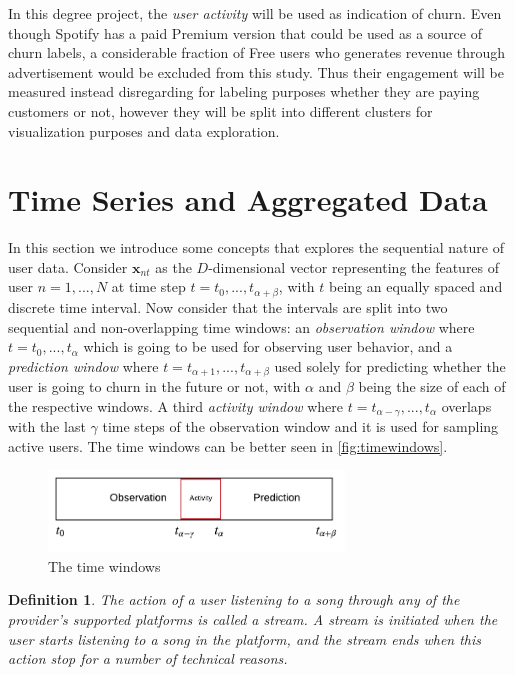 \documentclass{kththesis}
\newtheorem{definition}{Definition}
\begin{document}
In this degree project, the \emph{user activity} will be used as indication of churn. Even though Spotify has a paid Premium version that could be used as a source of churn labels, a considerable fraction of Free users who generates revenue through advertisement would be excluded from this study. Thus their engagement will be measured instead disregarding for labeling purposes whether they are paying customers or not, however they will be split into different clusters for visualization purposes and data exploration.

\section{Time Series and Aggregated Data}
\label{sec:timewindows}

In this section we introduce some concepts that explores the sequential nature of user data. Consider $\mathbf{x}_{nt}$ as the $D$-dimensional vector representing the features of user $n=1,...,N$ at time step $t = t_0,...,t_{\alpha+\beta}$, with $t$ being an equally spaced and discrete time interval. Now consider that the intervals are split into two sequential and non-overlapping time windows: an \emph{observation window} where $t = t_0,...,t_\alpha$ which is going to be used for observing user behavior, and a \emph{prediction window} where $t = t_{\alpha+1},...,t_{\alpha+\beta}$ used solely for predicting whether the user is going to churn in the future or not, with $\alpha$ and $\beta$ being the size of each of the respective windows. A third \emph{activity window} where $t=t_{\alpha-\gamma},...,t_\alpha$ overlaps with the last $\gamma$ time steps of the observation window and it is used for sampling active users. The time windows can be better seen in \autoref{fig:timewindows}.

\begin{figure}[h]
    \centering
    \includegraphics[width=0.7\textwidth,keepaspectratio]{figures/timewindows.pdf}
    \caption{The time windows}
    \label{fig:timewindows}
\end{figure}

\begin{definition}
The action of a user listening to a song through any of the provider's supported platforms is called a \emph{stream}. A stream is initiated when the user starts listening to a song in the platform, and the stream ends when this action stop for a number of technical reasons.
\end{definition}
\end{document}
